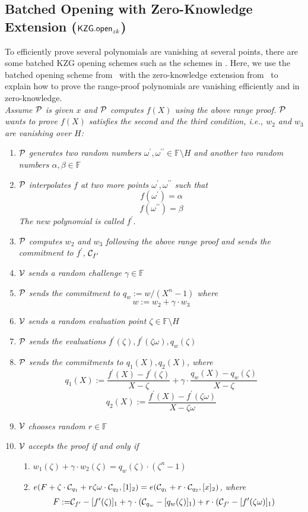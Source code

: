 \subsection{Batched Opening with Zero-Knowledge Extension ($\mathsf{KZG.open}_{zk}$)}
\label{sec:kgzzkp}
To efficiently prove several polynomials are vanishing at several points, there are some batched KZG opening schemes such as the schemes in \cite{plonk,bdfg,fflonk}. Here, we use the batched opening scheme from~\cite{plonk} with the zero-knowledge extension from~\cite{rangeproof} to explain how to prove the range-proof polynomials are vanishing efficiently and in zero-knowledge. \\
\textit{Assume $\mathcal{P}$ is given $x$ and $\mathcal{P}$ computes $f(X)$ using the above range proof. $\mathcal{P}$ wants to prove $f(X)$ satisfies the second and the third condition, i.e., $w_2$ and $w_3$ are vanishing over $H$:}
\begin{enumerate}
    \item $\mathcal{P}$ \textit{generates two random numbers $\omega^{\prime},\omega^{\prime\prime}\in\mathbb{F}\setminus{H}$ and another two random numbers $\alpha,\beta\in\mathbb{F}$}
    \item $\mathcal{P}$ \textit{interpolates $f$ at two more points ${\omega^{\prime},\omega^{\prime\prime}}$ such that}
    \[ f(\omega^{\prime})=\alpha \]
    \[ f(\omega^{\prime\prime})=\beta \]
    \textit{The new polynomial is called $f^\prime$.}
    \item $\mathcal{P}$ \textit{computes $w_2$ and $w_3$ following the above range proof and sends the commitment to $f^\prime$,} $\mathcal{C}_{f^\prime}$
    \item $\mathcal{V}$ \textit{sends a random challenge $\gamma\in\mathbb{F}$}
    \item $\mathcal{P}$ \textit{sends the commitment to $q_w:=w/(X^n-1)$ where}
    \[ w:=w_2+\gamma\cdot{w_3} \]
    \item $\mathcal{V}$ \textit{sends a random evaluation point $\zeta\in\mathbb{F}\setminus{H}$}
    \item $\mathcal{P}$ \textit{sends the evaluations $f^\prime(\zeta),f^\prime(\zeta\omega),q_w(\zeta)$}
    \item $\mathcal{P}$ \textit{sends the commitments to $q_1(X),q_2(X)$, where}
    \[ q_1(X):=\frac{f^\prime(X)-f^\prime(\zeta)}{X-\zeta}+\gamma\cdot\frac{q_w(X)-q_w(\zeta)}{X-\zeta} \]
    \[ q_2(X):=\frac{f^\prime(X)-f^\prime(\zeta\omega)}{X-\zeta\omega} \]
    \item $\mathcal{V}$ \textit{chooses random $r\in\mathbb{F}$}
    \item $\mathcal{V}$ \textit{accepts the proof if and only if}
    \begin{enumerate}
    	\item $w_1(\zeta)+\gamma\cdot{w_2(\zeta)}=q_w(\zeta)\cdot(\zeta^n-1)$
    	\item $e(F+\zeta\cdot\mathcal{C}_{q_1}+r\zeta\omega\cdot\mathcal{C}_{q_2},[1]_2)=e(\mathcal{C}_{q_1}+r\cdot\mathcal{C}_{q_2},[x]_2)$\textit{, where}
    	\begin{align*}
    		F:=&\mathcal{C}_{f^\prime}-[f^\prime(\zeta)]_1+\gamma\cdot(\mathcal{C}_{q_w}-[q_w(\zeta)]_1)+r\cdot(\mathcal{C}_{f^\prime}-[f^\prime(\zeta\omega)]_1)
    	\end{align*}
    \end{enumerate}
\end{enumerate}

